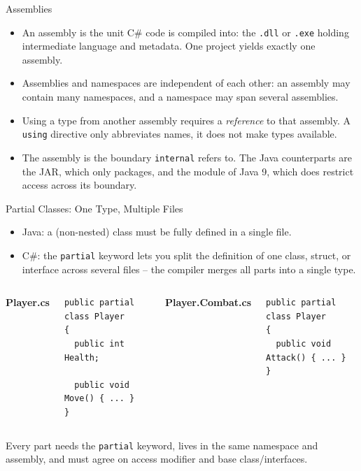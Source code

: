 \begin{frame}{Assemblies}
  \begin{itemize}
    \item An assembly is the unit C\# code is compiled into: the \texttt{.dll}
      or \texttt{.exe} holding intermediate language and metadata. One project
      yields exactly one assembly.
    \item Assemblies and namespaces are independent of each other: an assembly
      may contain many namespaces, and a namespace may span several assemblies.
    \item Using a type from another assembly requires a \emph{reference} to
      that assembly. A \texttt{using} directive only abbreviates names, it does
      not make types available.
    \item The assembly is the boundary \texttt{internal} refers to. The Java
      counterparts are the JAR, which only packages, and the module of Java 9,
      which does restrict access across its boundary.
  \end{itemize}
  \vspace{1ex}

\end{frame}

\begin{frame}[fragile]{Partial Classes: One Type, Multiple Files}
  \begin{itemize}
    \item Java: a (non-nested) class must be fully defined in a single file.
    \item C\#: the \texttt{partial} keyword lets you split the definition
      of one class, struct, or interface across several files -- the
      compiler merges all parts into a single type.
  \end{itemize}
  \begin{columns}[T]
      \textbf{Player.cs}
      \begin{lstlisting}
public partial class Player
{
  public int Health;

  public void Move() { ... }
}
      \end{lstlisting}
      \textbf{Player.Combat.cs}
      \begin{lstlisting}
public partial class Player
{
  public void Attack() { ... }
}
      \end{lstlisting}
  \end{columns}

  Every part needs the \texttt{partial} keyword, lives in the
  same namespace and assembly, and must agree on access modifier
  and base class/interfaces.


\end{frame}


